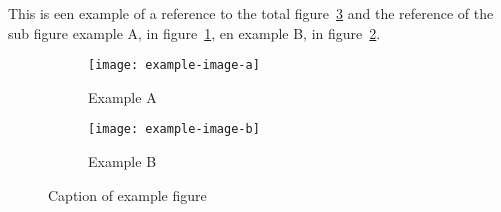 \documentclass[11pt]{article}
\begin{document}
    This is een example of a reference to the total figure~\ref{fig:caption_of_example_figure} and the reference of
    the sub figure example A, in figure~\ref{fig:example_a}, en example B, in figure~\ref{fig:example_b}.

    \begin{figure}[t!]%
        \begin{subfigure}[t]{0.5\linewidth}%
            \texttt{[image: example-image-a]}
            \caption{\footnotesize{Example A}}%
            \label{fig:example_a}%
        \end{subfigure}%

        \begin{subfigure}[t]{0.5\linewidth}%
            \texttt{[image: example-image-b]}
            \caption{\footnotesize{Example B}}%
            \label{fig:example_b}%
        \end{subfigure}%
        \caption{Caption of example figure}
        \label{fig:caption_of_example_figure}%
    \end{figure}
\end{document}
